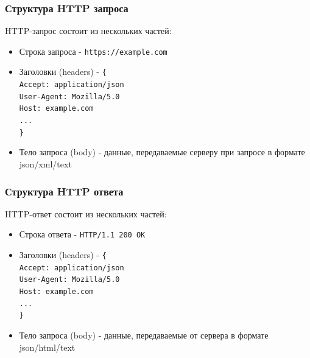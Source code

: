 \documentclass[aspectratio=169]{beamer}
\begin{document}

\begin{frame}
  \frametitle{Структура HTTP запроса}
  \begin{center}
    HTTP-запрос состоит из нескольких частей:
    \bigskip
    \begin{itemize}
    \item Строка запроса - \texttt{https://example.com}
    \item Заголовки (headers) - \texttt{\{ \\
        Accept: application/json \\
        User-Agent: Mozilla/5.0 \\
        Host: example.com \\
        ... \\
        \}}
      
    \item Тело запроса (body) - данные, передаваемые серверу при запросе в формате json/xml/text
      
    \end{itemize}
  \end{center}
\end{frame}


\begin{frame}
  \frametitle{Структура HTTP ответа}

  \begin{center}
    HTTP-ответ состоит из нескольких частей:
    \bigskip
    \begin{itemize}
    \item Строка ответа - \texttt{HTTP/1.1 200 OK}
    \item Заголовки (headers) - \texttt{\{ \\
        Accept: application/json \\
        User-Agent: Mozilla/5.0 \\
        Host: example.com \\
        ... \\
        \}}
      
    \item Тело запроса (body) - данные, передаваемые от сервера в формате json/html/text
      
    \end{itemize}
  \end{center}
  
\end{frame}
\end{document}
